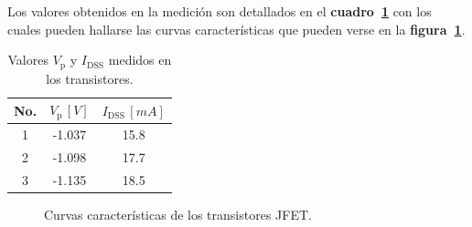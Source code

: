 Los valores obtenidos en la medición son detallados en el
\textbf{cuadro~\ref{cuadro05}} con los cuales pueden hallarse las curvas
características que pueden verse en la \textbf{figura~\ref{curva01}}.

\begin{table}[!ht]
\begin{center}
    \begin{tabular}{|c||c|c|}
    \hline
    No. & $V_{\text{p}}\,[V]$ & $I_{\text{DSS}}\,[mA]$
    \tabularnewline \hline \hline
    1 & -1.037 & 15.8
    \tabularnewline \hline
    2 & -1.098 & 17.7
    \tabularnewline \hline
    3 & -1.135 & 18.5
    \tabularnewline \hline
    \end{tabular}
\end{center}
\caption{Valores $V_{\text{p}}$ y $I_{\text{DSS}}$ medidos en los transistores.}
\label{cuadro05}
\end{table}

\begin{figure}[!ht]
    \centering
    
    \caption{Curvas características de los transistores JFET.}
    \label{curva01}
\end{figure}

